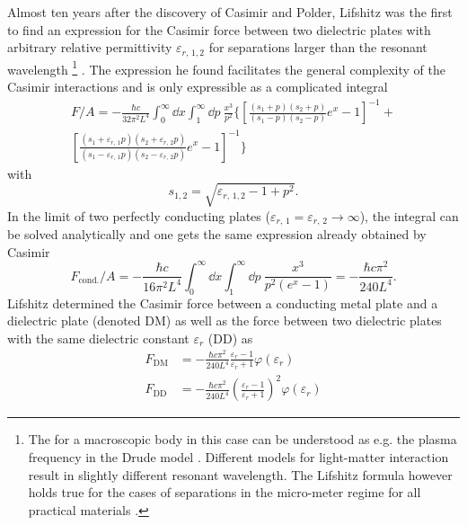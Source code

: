 Almost ten years after the discovery of Casimir and Polder, Lifshitz was the first to find an expression for the Casimir force between two dielectric plates with arbitrary relative permittivity $\varepsilon_{r,\,1,2}$ for separations larger than the resonant wavelength \footnote{The  for a macroscopic body in this case can be understood as e.g. the plasma frequency in the Drude model \cite{Ford_1998}. Different models for light-matter interaction result in slightly different resonant wavelength. The Lifshitz formula however holds true for the cases of separations in the micro-meter regime for all practical materials \cite{Kamp_2020}.} \cite{Lifshitz_1956}.
The expression he found facilitates the general complexity of the Casimir interactions and is only expressible as a complicated integral \cite{Lifshitz_1956}
\begin{multline}\label{eq:3:lifshitz-general-integral}
  F/A = -\frac{\hbar c}{32 \pi^2 L^4} \int_0^\infty \dd x \int_1^\infty \dd p \ \frac{x^3}{p^2}\biggl\{ \left[ \frac{(s_1+p)(s_2+p)}{(s_1-p)(s_2-p)} e^x - 1 \right]^{-1} + \\
  \left[ \frac{(s_1+ \varepsilon_{r,\,1} p)(s_2 + \varepsilon_{r,\,2} p)}{(s_1 - \varepsilon_{r,\,1} p)(s_2 - \varepsilon_{r,\,2} p)} e^x - 1 \right]^{-1} \biggr\}
\end{multline}
with
\begin{equation*}
  s_{1,2} = \sqrt{\varepsilon_{r,\,1,2} - 1 + p^2} .
\end{equation*}
In the limit of two perfectly conducting plates ($\varepsilon_{r,\,1} = \varepsilon_{r,\,2} \rightarrow \infty$), the integral can be solved analytically and one gets the same expression already obtained by Casimir
\begin{equation}
  F_\mathrm{cond.}/A = -\frac{\hbar c}{16 \pi^2 L^4} \int_0^\infty \dd x \int_1^\infty \dd p \ \frac{x^3}{p^2 (e^x - 1)} = -\frac{\hbar c \pi^2}{240 L^4} .
\end{equation}
Lifshitz determined the Casimir force between a conducting metal plate and a dielectric plate (denoted $\mathrm{DM}$) as well as the force between two dielectric plates with the same dielectric constant $\varepsilon_r$ ($\mathrm{DD}$) as
\begin{align} \label{eq:3:casimir-pp-F-DM-lifshitz}
  F_\mathrm{DM} &= -\frac{\hbar c \pi^2}{240 L^4} \frac{\varepsilon_r - 1}{\varepsilon_r + 1} \varphi(\varepsilon_r) \\
  F_\mathrm{DD} &= -\frac{\hbar c \pi^2}{240 L^4} \left( \frac{\varepsilon_r - 1}{\varepsilon_r + 1} \right)^2 \varphi(\varepsilon_r)\label{eq:3:casimir-pp-F-DD-lifshitz}
\end{align}
